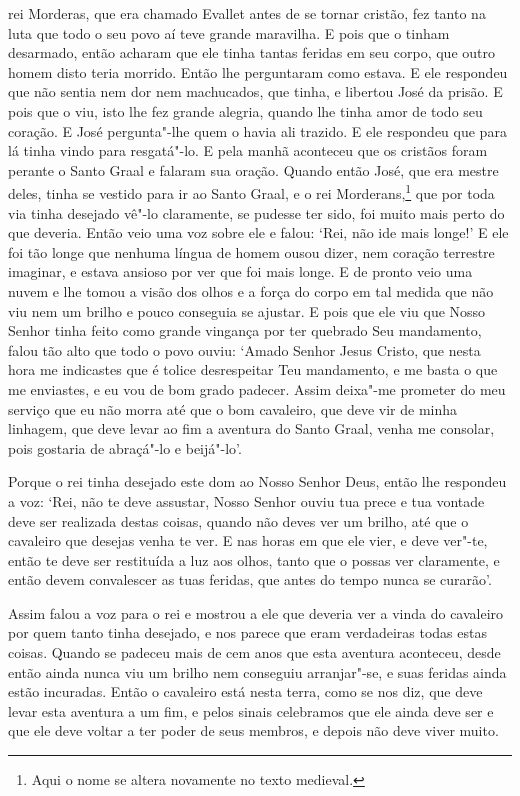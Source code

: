 rei Morderas, que era chamado Evallet antes de se tornar cristão, fez tanto na
luta que todo o seu povo aí teve grande maravilha. E pois que o tinham
desarmado, então acharam que ele tinha tantas feridas em seu corpo, que outro
homem disto teria morrido. Então lhe perguntaram como estava. E ele respondeu
que não sentia nem dor nem machucados, que tinha, e libertou José da prisão. E
pois que o viu, isto lhe fez grande alegria, quando lhe tinha amor de todo  seu
coração. E José pergunta"-lhe quem o havia ali trazido. E ele respondeu que para
lá tinha vindo para resgatá"-lo. E pela manhã aconteceu que os cristãos foram
perante o Santo Graal e falaram sua oração. Quando então José, que era mestre
deles, tinha se vestido para ir ao Santo Graal, e o rei Morderans,\footnote{
Aqui o nome se altera novamente no texto medieval.}  que por toda
via tinha desejado vê"-lo claramente, se pudesse ter sido, foi muito mais perto
do que deveria. Então veio uma voz sobre ele e falou: ‘Rei, não ide mais
longe!’ E ele foi tão longe que nenhuma língua de homem ousou dizer, nem
coração terrestre imaginar, e estava ansioso por ver que foi mais longe. E de
pronto veio uma nuvem e lhe tomou a visão dos olhos e a força do corpo em tal
medida que não viu nem um brilho e pouco conseguia se ajustar. E pois que ele
viu que Nosso Senhor tinha feito como grande vingança por ter quebrado Seu
mandamento, falou tão alto que todo o povo ouviu: ‘Amado Senhor Jesus Cristo,
que nesta hora me indicastes que é tolice desrespeitar Teu mandamento, e me
basta o que me enviastes, e eu vou de bom grado padecer. Assim
deixa"-me prometer do meu serviço que eu não morra até que o bom cavaleiro, que
deve vir de minha linhagem, que deve levar ao fim a aventura do Santo Graal,
venha me consolar, pois gostaria de abraçá"-lo e beijá"-lo’. 

Porque o rei tinha desejado este dom ao Nosso Senhor Deus, então lhe
respondeu a voz: ‘Rei, não te deve assustar, Nosso Senhor ouviu tua prece e tua
vontade deve ser realizada destas coisas, quando não deves ver um brilho, até
que o cavaleiro que desejas venha te ver. E nas horas em que ele vier, e deve
ver"-te, então te deve ser restituída a luz aos olhos, tanto que o possas ver
claramente, e então devem convalescer as tuas feridas, que antes do tempo nunca
se curarão’. 

Assim falou a voz para o rei e mostrou a ele que deveria ver a vinda do
cavaleiro por quem tanto tinha desejado, e nos parece que eram verdadeiras
todas estas coisas. Quando se padeceu mais de cem anos que esta aventura
aconteceu, desde então ainda nunca viu um brilho nem conseguiu arranjar"-se, e
suas feridas ainda estão incuradas. Então o cavaleiro está nesta terra, como se
nos diz, que deve levar esta aventura a um fim, e pelos sinais celebramos que
ele ainda deve ser e que ele deve voltar a ter poder de seus membros, e depois
não deve viver muito. 

